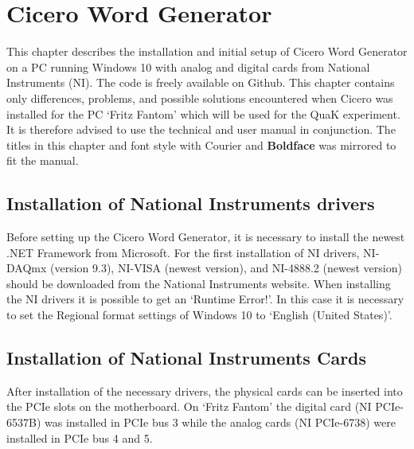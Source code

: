 
\chapter{Cicero Word Generator}\label{chap:Cicero, Cicero Word Generator}
This chapter describes the installation and initial setup of Cicero Word Generator\autocite{keshet2013distributed} on a PC running Windows 10 with analog and digital cards from National Instruments (NI). The code is freely available on Github\autocite{akeshet:Github}. This chapter contains only differences, problems, and possible solutions encountered when Cicero was installed for the PC `Fritz Fantom' which will be used for the QuaK experiment. It is therefore advised to use the technical and user manual\autocite{akeshet:manual} in conjunction. The titles in this chapter and font style with {\selectfont Courier} and \textbf{Boldface} was mirrored to fit the manual.

\section{Installation of National Instruments drivers}\label{sec:Cicero, Installation of National Instruments drivers}
Before setting up the Cicero Word Generator, it is necessary to install the newest .NET Framework\autocite{microsoft:download.net} from Microsoft. For the first installation of NI drivers, NI-DAQmx (version 9.3), NI-VISA (newest version), and NI-4888.2 (newest version) should be downloaded from the National Instruments website\autocite{ni:drivers}. When installing the NI drivers it is possible to get an `Runtime Error!'. In this case it is necessary to set the Regional format settings of Windows 10 to `English (United States)'\autocite{ni:runtimeerror}.

\section{Installation of National Instruments Cards}\label{sec:Cicero, Installation of National Instruments Cards}
After installation of the necessary drivers, the physical cards can be inserted into the PCIe slots on the motherboard. On `Fritz Fantom' the digital card (NI PCIe-6537B) was installed in PCIe bus 3 while the analog cards (NI PCIe-6738) were installed in PCIe bus 4 and 5.

